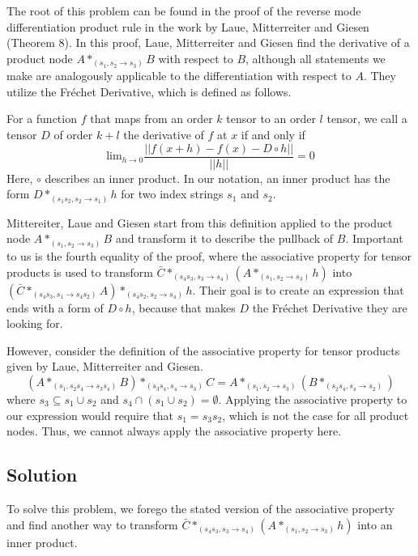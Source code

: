 \documentclass[12pt, a4paper]{report}
\begin{document}
The root of this problem can be found in the proof of the reverse mode differentiation product rule in the work \cite{tensorpaper} by Laue, Mitterreiter and Giesen (Theorem 8).
In this proof, Laue, Mitterreiter and Giesen find the derivative of a product node $A *_{(s_1, s_2 \rightarrow s_3)} B$ with respect to $B$, although all statements we make are analogously applicable to the differentiation with respect to $A$.
They utilize the Fr\'{e}chet Derivative, which is defined as follows.

For a function $f$ that maps from an order $k$ tensor to an order $l$ tensor, we call a tensor $D$ of order $k+l$ the derivative of $f$ at $x$ if and only if
$$
\text{lim}_{h \rightarrow 0} \frac{||f(x+h) - f(x) - D \circ h||}{||h||} = 0
$$
Here, $\circ$ describes an inner product.
In our notation, an inner product has the form $D *_{(s_1 s_2, s_2 \rightarrow s_1)} h$ for two index strings $s_1$ and $s_2$.

Mittereiter, Laue and Giesen start from this definition applied to the product node $A *_{(s_1, s_2 \rightarrow s_3)} B$ and transform it to describe the pullback of $B$.
Important to us is the fourth equality of the proof, where the associative property for tensor products is used to transform $\bar{C} *_{(s_4s_3,s_3 \rightarrow s_4)} (A *_{(s_1,s_2 \rightarrow s_3)} h)$ into $(\bar{C} *_{(s_4s_3,s_1 \rightarrow s_4s_2)} A) *_{(s_4s_2,s_2 \rightarrow s_4)} h$.
Their goal is to create an expression that ends with a form of $D \circ h$, because that makes $D$ the Fr\'{e}chet Derivative they are looking for.

However, consider the definition of the associative property for tensor products given by Laue, Mitterreiter and Giesen.
$$
(A *_{(s_1, s_2 s_4 \rightarrow s_3 s_4)} B) *_{(s_3 s_4, s_4 \rightarrow s_3)} C = A *_{(s_1, s_2 \rightarrow s_3)} (B *_{(s_2 s_4, s_4 \rightarrow s_2)})
$$
where $s_3 \subseteq s_1 \cup s_2$ and $s_4 \cap (s_1 \cup s_2) = \emptyset$. 
Applying the associative property to our expression would require that $s_1 = s_3 s_2$, which is not the case for all product nodes.
Thus, we cannot always apply the associative property here.

\subsection{Solution}
To solve this problem, we forego the stated version of the associative property and find another way to transform $\bar{C} *_{(s_4s_3,s_3 \rightarrow s_4)} (A *_{(s_1,s_2 \rightarrow s_3)} h)$ into an inner product.
\end{document}
